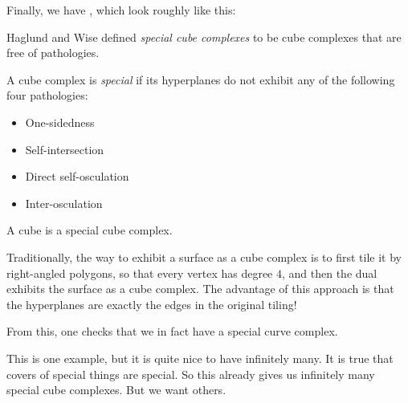 \documentclass[a4paper]{article}
\begin{document}
Finally, we have , which look roughly like this:
\begin{center}
\end{center}

Haglund and Wise defined \emph{special cube complexes} to be cube complexes that are free of pathologies.
\begin{defi}
  A cube complex is \emph{special} if its hyperplanes do not exhibit any of the following four pathologies:
  \begin{itemize}
    \item One-sidedness
    \item Self-intersection
    \item Direct self-osculation
    \item Inter-osculation
  \end{itemize}
\end{defi}

\begin{eg}
  A cube is a special cube complex.
\end{eg}

\begin{eg}
  Traditionally, the way to exhibit a surface as a cube complex is to first tile it by right-angled polygons, so that every vertex has degree $4$, and then the dual exhibits the surface as a cube complex. The advantage of this approach is that the hyperplanes are exactly the edges in the original tiling!


  From this, one checks that we in fact have a special curve complex.
\end{eg}
This is one example, but it is quite nice to have infinitely many. It is true that covers of special things are special. So this already gives us infinitely many special cube complexes. But we want others.
\end{document}
